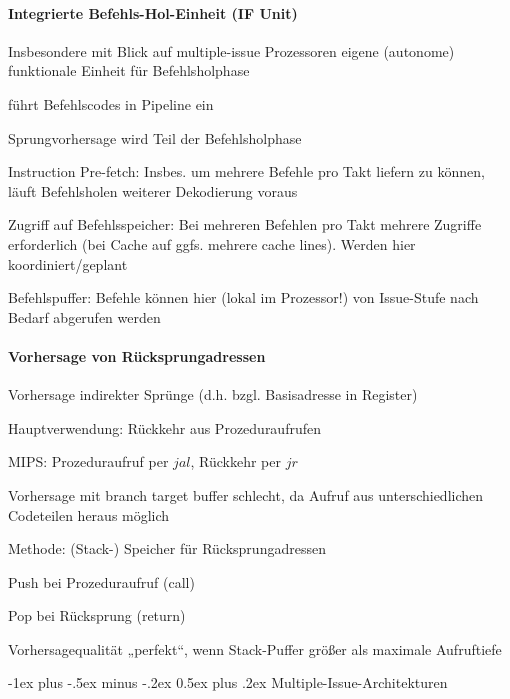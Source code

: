 \documentclass[a4paper]{article}
\makeatletter
\renewcommand{\section}{\@startsection{section}{1}{0mm}%
                                {-1ex plus -.5ex minus -.2ex}%
                                {0.5ex plus .2ex}%
                                {\normalfont\large\bfseries}}
\makeatother
\begin{document}
\begin{multicols}{3}
  \paragraph{Integrierte Befehls-Hol-Einheit (IF Unit)}
  Insbesondere mit Blick auf multiple-issue Prozessoren eigene (autonome) funktionale Einheit für Befehlsholphase
  \begin{itemize*}
    \item führt Befehlscodes in Pipeline ein
    \item Sprungvorhersage wird Teil der Befehlsholphase
    \item Instruction Pre-fetch: Insbes. um mehrere Befehle pro Takt liefern zu können, läuft Befehlsholen weiterer Dekodierung voraus
    \item Zugriff auf Befehlsspeicher: Bei mehreren Befehlen pro Takt mehrere Zugriffe erforderlich (bei Cache auf ggfs. mehrere cache lines). Werden hier koordiniert/geplant
    \item Befehlspuffer: Befehle können hier (lokal im Prozessor!) von Issue-Stufe nach Bedarf abgerufen werden
  \end{itemize*}
  
  \paragraph{Vorhersage von Rücksprungadressen}
  Vorhersage indirekter Sprünge (d.h. bzgl. Basisadresse in Register)
  \begin{itemize*}
    \item Hauptverwendung: Rückkehr aus Prozeduraufrufen
    \item MIPS: Prozeduraufruf per $jal$, Rückkehr per $jr$
    \item Vorhersage mit branch target buffer schlecht, da Aufruf aus unterschiedlichen Codeteilen heraus möglich
    \item Methode: (Stack-) Speicher für Rücksprungadressen
    \item Push bei Prozeduraufruf (call)
    \item Pop bei Rücksprung (return)
    \item Vorhersagequalität „perfekt“, wenn Stack-Puffer größer als maximale Aufruftiefe
  \end{itemize*}
  
  \section{Multiple-Issue-Architekturen}

\end{multicols}
\end{document}
